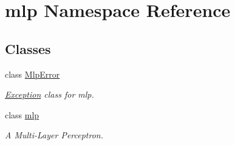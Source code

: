 \hypertarget{namespacemlp}{
\section{mlp Namespace Reference}
\label{namespacemlp}
}
\subsection*{Classes}
\begin{DoxyCompactItemize}
\item 
class \hyperlink{classmlp_1_1MlpError}{MlpError}
\begin{DoxyCompactList}\small\item\em \hyperlink{classException}{Exception} class for mlp. \item\end{DoxyCompactList}\item 
class \hyperlink{classmlp_1_1mlp}{mlp}
\begin{DoxyCompactList}\small\item\em A Multi-\/Layer Perceptron. \item\end{DoxyCompactList}\end{DoxyCompactItemize}
